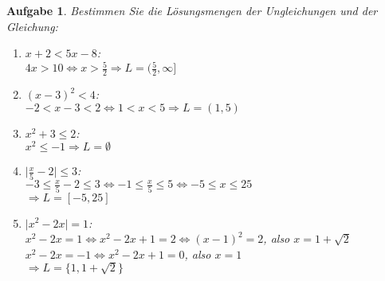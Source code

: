 \documentclass[12pt]{article}
\newtheorem{exercise}[satz]{Aufgabe}
\begin{document}
\begin{exercise}
  Bestimmen Sie die L\"osungsmengen der Ungleichungen und der Gleichung:
  \begin{enumerate}
    \item[(a)] $x+2<5x-8$:\\ 
         $4x>10 \Leftrightarrow x>\frac{5}{2} \Rightarrow L = (\frac{5}{2},\infty]$
    \item[(b)] $(x-3)^2<4$:\\ 
         $ -2<x-3<2 \Leftrightarrow 1<x<5 \Rightarrow L = (1,5)$
    \item[(c)] $x^2+3\leq 2$:\\ 
         $ x^2 \leq -1 \Rightarrow L = \emptyset$
    \item[(d)] $\vert \frac{x}{5}-2 \vert \leq 3$:\\ 
         $-3 \leq \frac{x}{5}-2 \leq 3 \Leftrightarrow -1 \leq \frac{x}{5} \leq 5\Leftrightarrow -5 \leq x \leq 25$\\
         $\Rightarrow L =[-5,25]$
    \item[(e)] $\vert x^2-2x \vert = 1$:\\ 
        $ x^2-2x = 1 \Leftrightarrow x^2-2x+1 = 2 \Leftrightarrow (x-1)^2 = 2$, also $x = 1+\sqrt{2}$\\
        $ x^2-2x = -1 \Leftrightarrow x^2-2x+1 = 0 $, also $x = 1$\\
        $\Rightarrow L =\{1,1+\sqrt{2}\}$
  \end{enumerate}
\end{exercise}
\end{document}
